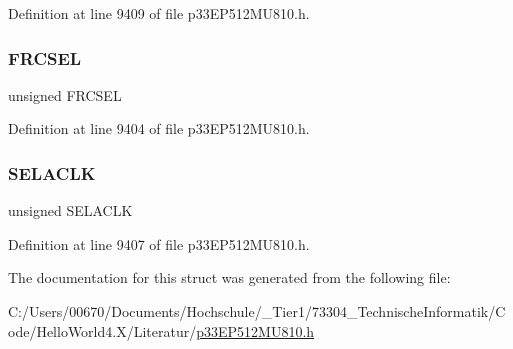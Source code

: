 Definition at line 9409 of file p33\+E\+P512\+M\+U810.\+h.

\mbox{\label{structtag_a_c_l_k_c_o_n3_b_i_t_s_a4d164102564cf4ab94d34ad577e7bd39}} 
\subsubsection{\texorpdfstring{F\+R\+C\+S\+EL}{FRCSEL}}
{\footnotesize\ttfamily unsigned F\+R\+C\+S\+EL}



Definition at line 9404 of file p33\+E\+P512\+M\+U810.\+h.

\mbox{\label{structtag_a_c_l_k_c_o_n3_b_i_t_s_aef06a2deb781b3085fc4a336124a60df}} 
\subsubsection{\texorpdfstring{S\+E\+L\+A\+C\+LK}{SELACLK}}
{\footnotesize\ttfamily unsigned S\+E\+L\+A\+C\+LK}



Definition at line 9407 of file p33\+E\+P512\+M\+U810.\+h.



The documentation for this struct was generated from the following file\+:\begin{DoxyCompactItemize}
\item 
C\+:/\+Users/00670/\+Documents/\+Hochschule/\+\_\+\+Tier1/73304\+\_\+\+Technische\+Informatik/\+Code/\+Hello\+World4.\+X/\+Literatur/\hyperlink{p33_e_p512_m_u810_8h}{p33\+E\+P512\+M\+U810.\+h}\end{DoxyCompactItemize}
